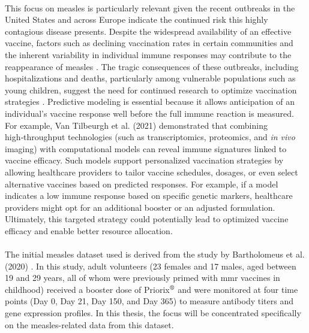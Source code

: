 \documentclass[12pt,a4paper]{report}
\begin{document}
\\
This focus on measles is particularly relevant given the recent outbreaks in the United States and across Europe indicate the continued risk this highly contagious disease presents. Despite the widespread availability of an effective vaccine, factors such as declining vaccination rates in certain communities and the inherent variability in individual immune responses may contribute to the reappearance of measles \cite{Broom2025Measles,WHOEuropeUNICEF2025Measles,CDC2025MeaslesData}. The tragic consequences of these outbreaks, including hospitalizations and deaths, particularly among vulnerable populations such as young children, suggest the need for continued research to optimize vaccination strategies \cite{moss2017measles}. Predictive modeling is essential because it allows anticipation of an individual’s vaccine response well before the full immune reaction is measured. For example, Van Tilbeurgh et al. (2021) \cite{vanTilbeurgh2021predictive} demonstrated that combining high‑throughput technologies (such as transcriptomics, proteomics, and \textit{in vivo} imaging) with computational models can reveal immune signatures linked to vaccine efficacy. Such models support personalized vaccination strategies by allowing healthcare providers to tailor vaccine schedules, dosages, or even select alternative vaccines based on predicted responses. For example, if a model indicates a low immune response based on specific genetic markers, healthcare providers might opt for an additional booster or an adjusted formulation. Ultimately, this targeted strategy could potentially lead to optimized vaccine efficacy and enable better resource allocation.\\
\\
The initial measles dataset used is derived from the study by Bartholomeus et al. (2020) \cite{bartholomeus2020transcriptomic}.
In this study, adult volunteers (23 females and 17 males, aged between 19 and 29 years, all of whom were previously primed with \gls{mmr} vaccines in childhood) received a booster dose of Priorix$^{\mbox{\scriptsize\textregistered}}$ and were monitored at four time points (Day 0, Day 21, Day 150, and Day 365) to measure antibody titers and gene expression profiles. In this thesis, the focus will be concentrated specifically on the measles-related data from this dataset. \\
\\
\end{document}
